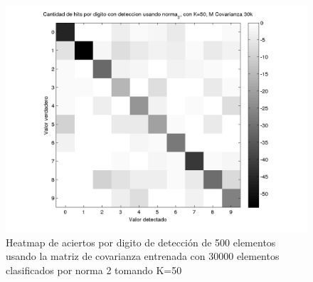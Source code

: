\begin{figure}[H]
\includegraphics[width=\hmwidth]{plots/heatmap-30kcv-k50-norma_2.png}
\caption{Heatmap de aciertos por digito de detecci\'on de 500 elementos usando la matriz de covarianza entrenada con 30000 elementos
clasificados por norma 2 tomando K=50 }
\label{fig:HM30kcv-k50}
\end{figure}
